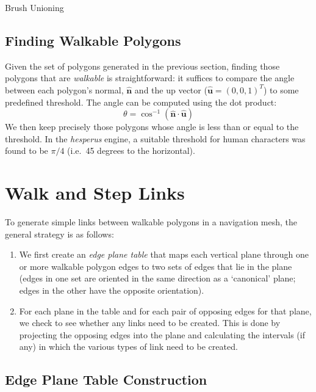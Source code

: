 \documentclass[10pt,twocolumn]{article}
\begin{document}
\begin{stulisting}[t]
\caption{Brush Unioning}
\label{code:brush-unioning}

\end{stulisting}

\subsection{Finding Walkable Polygons}

Given the set of polygons generated in the previous section, finding those polygons that are \emph{walkable} is straightforward: it suffices to compare the angle between each polygon's normal, $\mathbf{\hat{n}}$ and the up vector ($\mathbf{\hat{u}} = (0,0,1)^T$) to some predefined threshold. The angle can be computed using the dot product:
%
\[
\theta = \cos^{-1} \left( \mathbf{\hat{n}} \cdot \mathbf{\hat{u}} \right)
\]
%
We then keep precisely those polygons whose angle is less than or equal to the threshold. In the \emph{hesperus} engine, a suitable threshold for human characters was found to be $\pi/4$ (i.e.~45 degrees to the horizontal).

\section{Walk and Step Links}
\label{sec:walkstep}

To generate simple links between walkable polygons in a navigation mesh, the general strategy is as follows:
%
\begin{enumerate}
\item We first create an \emph{edge plane table} that maps each vertical plane through one or more walkable polygon edges to two sets of edges that lie in the plane (edges in one set are oriented in the same direction as a `canonical' plane; edges in the other have the opposite orientation).
\item For each plane in the table and for each pair of opposing edges for that plane, we check to see whether any links need to be created. This is done by projecting the opposing edges into the plane and calculating the intervals (if any) in which the various types of link need to be created.
\end{enumerate}

\subsection{Edge Plane Table Construction}
\end{document}
